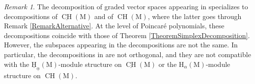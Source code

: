 \documentclass[11pt,reqno]{amsart}
\theoremstyle{definition}
\theoremstyle{remark}
\newtheorem{remark}[theorem]{Remark}
\renewcommand{\(}{\left(}
\renewcommand{\)}{\right)}
\newcommand{\<}{\left<}
\renewcommand{\>}{\right>}
\newcommand{\CH}{\operatorname{CH}}
\newcommand{\uCH}{\underline{\CH}}
\begin{document}
\begin{remark}
The decomposition of graded vector spaces appearing in \cite[Theorem 6.18]{AHK}
specializes to decompositions of $\uCH(\mathrm{M})$ and of $\CH(\mathrm{M})$, where the latter goes through
Remark \ref{RemarkAlternative}.  At the level of Poincar\'e polynomials, these decompositions coincide with those of 
Theorem \ref{TheoremSimplexDecomposition}.  However, the subspaces appearing in the decompositions
are not the same.  In particular, the decompositions in \cite[Theorem 6.18]{AHK} are not orthogonal, and they are not compatible with the
$\underline{\mathrm{H}}_{\underline{\alpha}}(\mathrm{M})$-module structure on $\uCH(\mathrm{M})$
or the $\mathrm{H}_{\alpha}(\mathrm{M})$-module structure on $\CH(\mathrm{M})$.
\end{remark}



\end{document}
